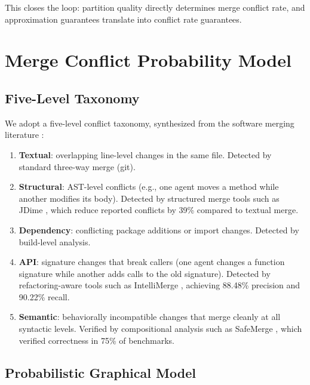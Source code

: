 \documentclass[11pt, a4paper, logo, copyright]{googledeepmind}
\begin{document}
This closes the loop: partition quality directly determines merge conflict rate, and approximation guarantees translate into conflict rate guarantees.


\section{Merge Conflict Probability Model}
\label{sec:merge}

\subsection{Five-Level Taxonomy}

We adopt a five-level conflict taxonomy, synthesized from the software merging literature \citep{Accioly2018, Sousa2018, Falleri2014, Apel2012}:

\begin{enumerate}[nosep]
  \item \textbf{Textual}: overlapping line-level changes in the same file. Detected by standard three-way merge (git).
  \item \textbf{Structural}: AST-level conflicts (e.g., one agent moves a method while another modifies its body). Detected by structured merge tools such as JDime \citep{Apel2012}, which reduce reported conflicts by 39\% compared to textual merge.
  \item \textbf{Dependency}: conflicting package additions or import changes. Detected by build-level analysis.
  \item \textbf{API}: signature changes that break callers (one agent changes a function signature while another adds calls to the old signature). Detected by refactoring-aware tools such as IntelliMerge \citep{Shen2019}, achieving 88.48\% precision and 90.22\% recall.
  \item \textbf{Semantic}: behaviorally incompatible changes that merge cleanly at all syntactic levels. Verified by compositional analysis such as SafeMerge \citep{Sousa2018}, which verified correctness in 75\% of benchmarks.
\end{enumerate}

\subsection{Probabilistic Graphical Model}
\end{document}
